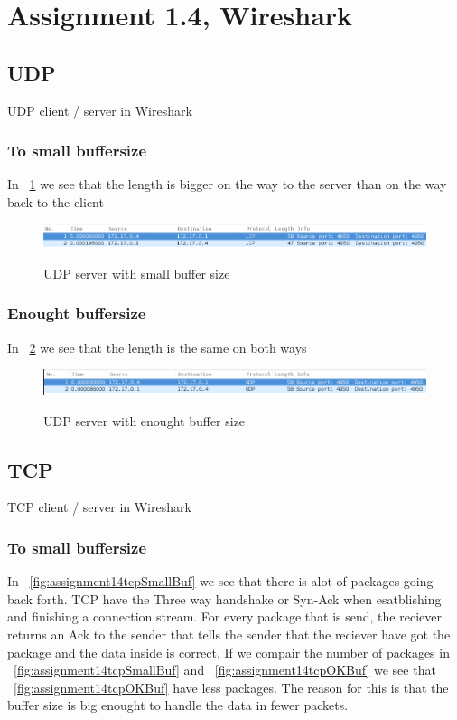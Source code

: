 \documentclass[a4paper,12pt]{article} %
\begin{document}
{\section{Assignment 1.4, Wireshark}

\subsection{UDP}
UDP client / server in Wireshark
\subsubsection{To small buffersize}
In ~\ref{fig:assignment14udpSmallBuf} we see that the length is bigger on
the way to the server than on the way back to the client

\begin{figure}[H]
    \centering  
    \includegraphics[scale=0.43]{img/assignment14udpSmallBuf.png}
	\label{fig:assignment14udpSmallBuf}
	\caption{UDP server with small buffer size}
\end{figure}


\subsubsection{Enought buffersize}
In ~\ref{fig:assignment14udpOKBuf} we see that the length is the same on both ways

\begin{figure}[H]
    \centering  
    \includegraphics[scale=0.43]{img/assignment14udpOKBuf.png}
	\label{fig:assignment14udpOKBuf}
	\caption{UDP server with enought buffer size}
\end{figure}


\clearpage

\subsection{TCP}
TCP client / server in Wireshark
\subsubsection{To small buffersize}
In ~\ref{fig:assignment14tcpSmallBuf} we see that there is alot of packages going back
forth.
TCP have the Three way handshake or Syn-Ack when esatblishing and finishing a connection stream. For every package that is send, the reciever returns an Ack to the sender that tells the sender that the reciever have got the package and the data inside is correct.
If we compair the number of packages in ~\ref{fig:assignment14tcpSmallBuf} and ~\ref{fig:assignment14tcpOKBuf} we see that ~\ref{fig:assignment14tcpOKBuf} have less packages. The reason for this is that the buffer size is big enought to handle the data in fewer packets.

}
\end{document}

